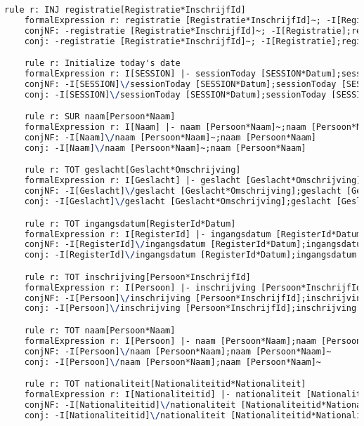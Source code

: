 \begin{lstlisting}[language=TeX]
    rule r: INJ registratie[Registratie*InschrijfId]
    formalExpression r: registratie [Registratie*InschrijfId]~; -I[Registratie];registratie [Registratie*InschrijfId] |- -I[InschrijfId]
    conjNF: -registratie [Registratie*InschrijfId]~; -I[Registratie];registratie [Registratie*InschrijfId]\/ -I[InschrijfId]
    conj: -registratie [Registratie*InschrijfId]~; -I[Registratie];registratie [Registratie*InschrijfId]\/ -I[InschrijfId]

    rule r: Initialize today's date
    formalExpression r: I[SESSION] |- sessionToday [SESSION*Datum];sessionToday [SESSION*Datum]~
    conjNF: -I[SESSION]\/sessionToday [SESSION*Datum];sessionToday [SESSION*Datum]~
    conj: -I[SESSION]\/sessionToday [SESSION*Datum];sessionToday [SESSION*Datum]~

    rule r: SUR naam[Persoon*Naam]
    formalExpression r: I[Naam] |- naam [Persoon*Naam]~;naam [Persoon*Naam]
    conjNF: -I[Naam]\/naam [Persoon*Naam]~;naam [Persoon*Naam]
    conj: -I[Naam]\/naam [Persoon*Naam]~;naam [Persoon*Naam]

    rule r: TOT geslacht[Geslacht*Omschrijving]
    formalExpression r: I[Geslacht] |- geslacht [Geslacht*Omschrijving];geslacht [Geslacht*Omschrijving]~
    conjNF: -I[Geslacht]\/geslacht [Geslacht*Omschrijving];geslacht [Geslacht*Omschrijving]~
    conj: -I[Geslacht]\/geslacht [Geslacht*Omschrijving];geslacht [Geslacht*Omschrijving]~

    rule r: TOT ingangsdatum[RegisterId*Datum]
    formalExpression r: I[RegisterId] |- ingangsdatum [RegisterId*Datum];ingangsdatum [RegisterId*Datum]~
    conjNF: -I[RegisterId]\/ingangsdatum [RegisterId*Datum];ingangsdatum [RegisterId*Datum]~
    conj: -I[RegisterId]\/ingangsdatum [RegisterId*Datum];ingangsdatum [RegisterId*Datum]~

    rule r: TOT inschrijving[Persoon*InschrijfId]
    formalExpression r: I[Persoon] |- inschrijving [Persoon*InschrijfId];inschrijving [Persoon*InschrijfId]~
    conjNF: -I[Persoon]\/inschrijving [Persoon*InschrijfId];inschrijving [Persoon*InschrijfId]~
    conj: -I[Persoon]\/inschrijving [Persoon*InschrijfId];inschrijving [Persoon*InschrijfId]~

    rule r: TOT naam[Persoon*Naam]
    formalExpression r: I[Persoon] |- naam [Persoon*Naam];naam [Persoon*Naam]~
    conjNF: -I[Persoon]\/naam [Persoon*Naam];naam [Persoon*Naam]~
    conj: -I[Persoon]\/naam [Persoon*Naam];naam [Persoon*Naam]~

    rule r: TOT nationaliteit[Nationaliteitid*Nationaliteit]
    formalExpression r: I[Nationaliteitid] |- nationaliteit [Nationaliteitid*Nationaliteit];nationaliteit [Nationaliteitid*Nationaliteit]~
    conjNF: -I[Nationaliteitid]\/nationaliteit [Nationaliteitid*Nationaliteit];nationaliteit [Nationaliteitid*Nationaliteit]~
    conj: -I[Nationaliteitid]\/nationaliteit [Nationaliteitid*Nationaliteit];nationaliteit [Nationaliteitid*Nationaliteit]~


\end{lstlisting}
